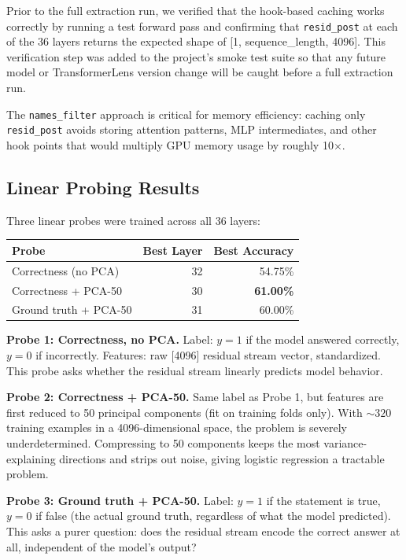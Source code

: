 \documentclass[11pt]{article}
\begin{document}
Prior to the full extraction run, we verified that the hook-based caching works correctly by running a test forward pass and confirming that \texttt{resid\_post} at each of the 36 layers returns the expected shape of [1, sequence\_length, 4096]. This verification step was added to the project's smoke test suite so that any future model or TransformerLens version change will be caught before a full extraction run.

The \texttt{names\_filter} approach is critical for memory efficiency: caching only \texttt{resid\_post} avoids storing attention patterns, MLP intermediates, and other hook points that would multiply GPU memory usage by roughly 10$\times$.

\subsection*{Linear Probing Results}

Three linear probes were trained across all 36 layers:

\begin{center}
\begin{tabular}{l r r}
\toprule
\textbf{Probe} & \textbf{Best Layer} & \textbf{Best Accuracy} \\
\midrule
Correctness (no PCA)    & 32 & 54.75\% \\
Correctness + PCA-50    & 30 & \textbf{61.00\%} \\
Ground truth + PCA-50   & 31 & 60.00\% \\
\bottomrule
\end{tabular}
\end{center}

\textbf{Probe 1: Correctness, no PCA.} Label: $y{=}1$ if the model answered correctly, $y{=}0$ if incorrectly. Features: raw [4096] residual stream vector, standardized. This probe asks whether the residual stream linearly predicts model behavior.

\textbf{Probe 2: Correctness + PCA-50.} Same label as Probe 1, but features are first reduced to 50 principal components (fit on training folds only). With ${\sim}320$ training examples in a 4096-dimensional space, the problem is severely underdetermined. Compressing to 50 components keeps the most variance-explaining directions and strips out noise, giving logistic regression a tractable problem.

\textbf{Probe 3: Ground truth + PCA-50.} Label: $y{=}1$ if the statement is true, $y{=}0$ if false (the actual ground truth, regardless of what the model predicted). This asks a purer question: does the residual stream encode the correct answer at all, independent of the model's output?
\end{document}
